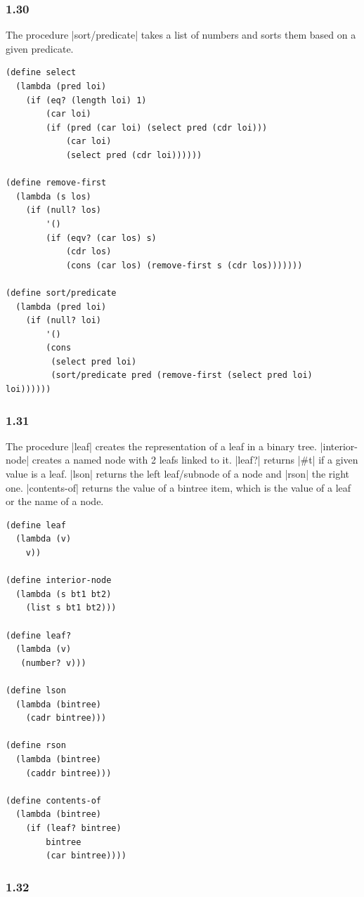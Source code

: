 \documentclass[a4paper]{article}
\begin{document}
\subsubsection*{1.30}

The procedure |sort/predicate| takes a list of numbers and sorts them based on a given predicate.

\begin{lstlisting}
(define select
  (lambda (pred loi)
    (if (eq? (length loi) 1)
        (car loi)
        (if (pred (car loi) (select pred (cdr loi)))
            (car loi)
            (select pred (cdr loi))))))

(define remove-first
  (lambda (s los)
    (if (null? los)
        '()
        (if (eqv? (car los) s)
            (cdr los)
            (cons (car los) (remove-first s (cdr los)))))))

(define sort/predicate
  (lambda (pred loi)
    (if (null? loi)
        '()
        (cons
         (select pred loi)
         (sort/predicate pred (remove-first (select pred loi) loi))))))
\end{lstlisting}

\subsubsection*{1.31}

The procedure |leaf| creates the representation of a leaf in a binary tree. |interior-node| creates a named node with 2 leafs linked to it. |leaf?| returns |#t| if a given value is a leaf. |lson| returns the left leaf/subnode of a node and |rson| the right one. |contents-of| returns the value of a bintree item, which is the value of a leaf or the name of a node.

\begin{lstlisting}
(define leaf
  (lambda (v)
    v))

(define interior-node
  (lambda (s bt1 bt2)
    (list s bt1 bt2)))

(define leaf?
  (lambda (v)
   (number? v)))

(define lson
  (lambda (bintree)
    (cadr bintree)))

(define rson
  (lambda (bintree)
    (caddr bintree)))

(define contents-of
  (lambda (bintree)
    (if (leaf? bintree)
        bintree
        (car bintree))))
\end{lstlisting}

\subsubsection*{1.32}
\end{document}
